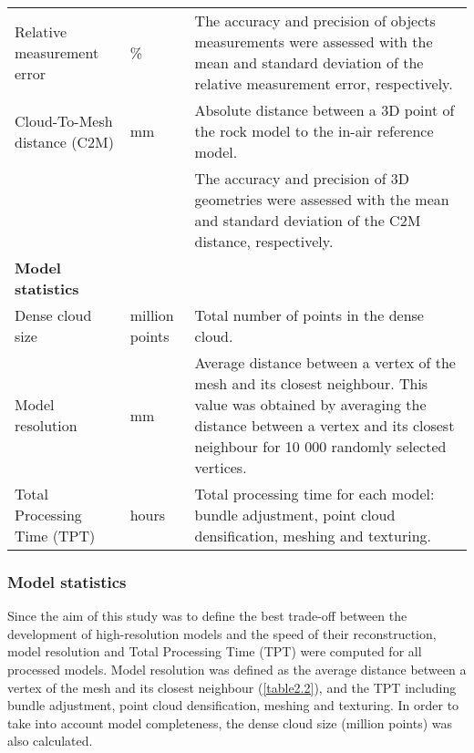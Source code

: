 \begin{table}[H]
{\begin{tabular}{L{4cm} L{1cm}L{10cm}}
Relative measurement error                             & \%             & The accuracy and precision of objects measurements were assessed with the mean and standard deviation of the relative measurement error, respectively. \\
Cloud-To-Mesh distance (C2M)                           & mm             & Absolute distance between a 3D point of the rock model to the in-air reference model. \\
                                                       &                & The accuracy and precision of 3D geometries were assessed with the mean and standard deviation of the C2M distance, respectively. \\
\midrule 
\textbf{Model statistics}                              &                &   \\
\midrule 
Dense cloud size                                       & million points & Total number of points in the dense cloud.\\
Model resolution                                       & mm             & Average distance between a vertex of the mesh and its closest neighbour. This value was obtained by averaging the distance between a vertex and its closest neighbour for 10 000 randomly selected vertices.  \\
Total Processing Time (TPT)                            & hours          & Total processing time for each model: bundle adjustment, point cloud densification, meshing and texturing.\\                                                       \bottomrule
\end{tabular}
    }
\end{table}

\subsubsection{Model statistics}\label{chapitre2_2.3.2}
Since the aim of this study was to define the best trade-off between the development of high-resolution models and the speed of their reconstruction, model resolution and Total Processing Time (TPT) were computed for all processed models. Model resolution was defined as the average distance between a vertex of the mesh and its closest neighbour (\autoref{table2.2}), and the TPT including bundle adjustment, point cloud densification, meshing and texturing. In order to take into account model completeness, the dense cloud size (million points) was also calculated.

